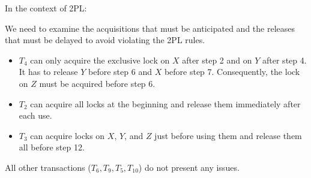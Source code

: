 In the context of 2PL:
\begin{table}[H]
    \centering
\end{table}
We need to examine the acquisitions that must be anticipated and the releases that must be delayed to avoid violating the 2PL rules.
\begin{itemize}
    \item $T_4$ can only acquire the exclusive lock on $X$ after step 2 and on $Y$ after step 4. 
        It has to release $Y$ before step 6 and $X$ before step 7. 
        Consequently, the lock on $Z$ must be acquired before step 6.
    \item $T_2$ can acquire all locks at the beginning and release them immediately after each use.
    \item $T_3$ can acquire locks on $X$, $Y$, and $Z$ just before using them and release them all before step 12.
\end{itemize}
All other transactions ($T_6, T_9, T_5, T_{10}$) do not present any issues.